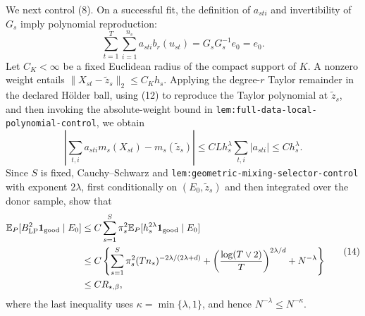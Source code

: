 We next control (8).  On a successful fit, the definition of \(a_{sti}\) and invertibility of \(G_s\) imply polynomial reproduction:
\[
\sum_{t=1}^{T}\sum_{i=1}^{n_s}a_{sti}b_r(u_{st})
=G_sG_s^{-1}e_0=e_0.
\tag{12}
\]
Let \(C_K<\infty\) be a fixed Euclidean radius of the compact support of \(K\).  A nonzero weight entails
\(\|X_{st}-\widetilde z_s\|_2\le C_Kh_s\).  Applying the degree-\(r\) Taylor remainder in the declared H\"older ball, using (12) to reproduce the Taylor polynomial at \(\widetilde z_s\), and then invoking the absolute-weight bound in \texttt{lem:full-data-local-polynomial-control}, we obtain
\[
\left|\sum_{t,i}a_{sti}m_s(X_{st})-m_s(\widetilde z_s)\right|
\le C L h_s^\lambda\sum_{t,i}|a_{sti}|
\le C h_s^\lambda.
\tag{13}
\]
Since \(S\) is fixed, Cauchy--Schwarz and \texttt{lem:geometric-mixing-selector-control} with exponent \(2\lambda\), first conditionally on \((E_0,\widetilde z_s)\) and then integrated over the donor sample, show that
\[
\begin{aligned}
\mathbb E_P[B_{\mathrm{LP}}^2\mathbf1_{\mathrm{good}}\mid E_0]
&\le C\sum_{s=1}^{S}\pi_s^2
 \mathbb E_P[h_s^{2\lambda}\mathbf1_{\mathrm{good}}\mid E_0]\\
&\le C\left\{
\sum_{s=1}^{S}\pi_s^2(Tn_s)^{-2\lambda/(2\lambda+d)}
+\left({\log(T\vee2)\over T}\right)^{2\lambda/d}
+N^{-\lambda}\right\}\\
&\le C R_{\star,\beta},
\end{aligned}
\tag{14}
\]
where the last inequality uses \(\kappa=\min\{\lambda,1\}\), and hence \(N^{-\lambda}\le N^{-\kappa}\).

